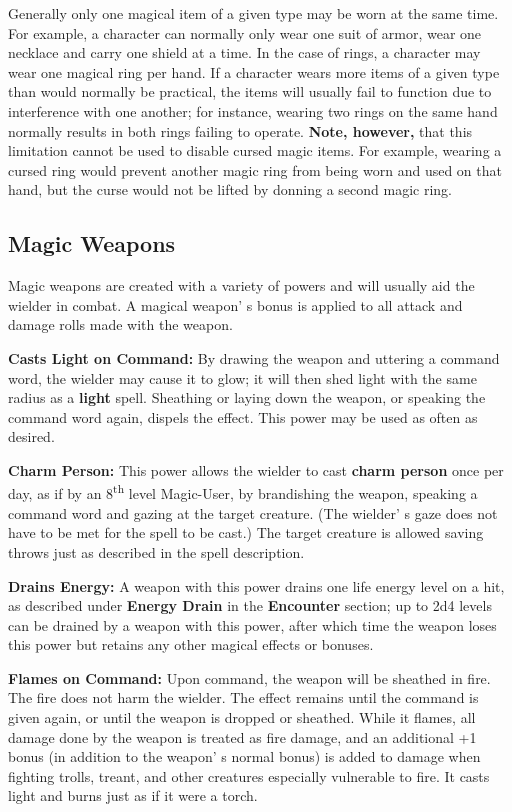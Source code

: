 \documentclass[a4paper,twoside,openany,10pt]{book}
\begin{document}
\begin{multicols}{2}
Generally only one magical item of a given type may be worn at the same time. For example, a character can normally only wear one suit of armor, wear one necklace and carry one shield at a time. In the case of rings, a character may wear one magical ring per hand. If a character wears more items of a given type than would normally be practical, the items will usually fail to function due to interference with one another; for instance, wearing two rings on the same hand normally results in both rings failing to operate. \textbf{Note, however, }that this limitation cannot be used to disable cursed magic items. For example, wearing a cursed ring would prevent another magic ring from being worn and used on that hand, but the curse would not be lifted by donning a second magic ring.

\subsection{Magic Weapons}\label{magic-weapons-1}

Magic weapons are created with a variety of powers and will usually aid the wielder in combat. A magical weapon' s bonus is applied to all attack and damage rolls made with the weapon.

\textbf{Casts Light on Command:} By drawing the weapon and uttering a command word, the wielder may cause it to glow; it will then shed light with the same radius as a \textbf{light} spell. Sheathing or laying down the weapon, or speaking the command word again, dispels the effect. This power may be used as often as desired.

\textbf{Charm Person:} This power allows the wielder to cast  \textbf{charm person} once per day, as if by an 8\textsuperscript{th} level Magic-User, by brandishing the weapon, speaking a command word and gazing at the target creature. (The wielder' s gaze does not have to be met for the spell to be cast.) The target creature is allowed saving throws just as described in the spell description. 

\textbf{Drains Energy:} A weapon with this power drains one life energy level on a hit, as described under \textbf{Energy Drain }in the \textbf{Encounter} section; up to 2d4 levels can be drained by a weapon with this power, after which time the weapon loses this power but retains any other magical effects or bonuses.

\textbf{Flames on Command:} Upon command, the weapon will be sheathed in fire. The fire does not harm the wielder. The effect remains until the command is given again, or until the weapon is dropped or sheathed. While it flames, all damage done by the weapon is treated as fire damage, and an additional +1 bonus (in addition to the weapon' s normal bonus) is added to damage when fighting trolls, treant, and other creatures especially vulnerable to fire. It casts light and burns just as if it were a torch. 


\end{multicols}
\end{document}
